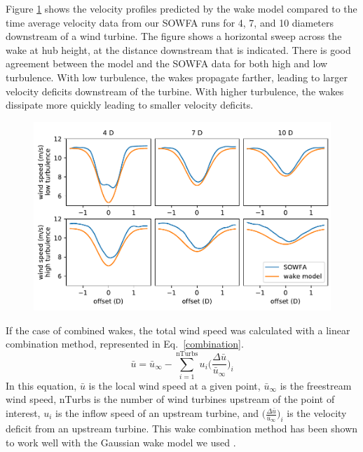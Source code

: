 \documentclass[11pt,letterpaper]{article}
\begin{document}
Figure \ref{velocity_profiles} shows the velocity profiles predicted by the wake model compared to the time average velocity data from our SOWFA runs for 4, 7, and 10 diameters downstream of a wind turbine. The figure shows a horizontal sweep across the wake at hub height, at the distance downstream that is indicated. There is good agreement between the model and the SOWFA data for both high and low turbulence. With low turbulence, the wakes propagate farther, leading to larger velocity deficits downstream of the turbine. With higher turbulence, the wakes dissipate more quickly leading to smaller velocity deficits. 
% 
\begin{figure}
    \centering
    \includegraphics[]{images/velocity_profiles.pdf}
    \caption{}
    \label{velocity_profiles}
\end{figure}

If the case of combined wakes, the total wind speed was calculated with a linear combination method, represented in Eq.~\ref{combination}.
%
\begin{equation}
    \label{combination}
    \bar{u} = \bar{u}_\infty - \sum_{i=1}^\text{nTurbs} u_i \Big(\frac{\Delta\bar{u}}{\bar{u}_{\infty}}\Big)_i
\end{equation}
% 
In this equation, $\bar{u}$ is the local wind speed at a given point, $\bar{u}_\infty$ is the freestream wind speed, $\text{nTurbs}$ is the number of wind turbines upstream of the point of interest, $u_i$ is the inflow speed of an upstream turbine, and $\Big(\frac{\Delta\bar{u}}{\bar{u}_{\infty}}\Big)_i$ is the velocity deficit from an upstream turbine. This wake combination method has been shown to work well with the Gaussian wake model we used \cite{niayifar2016analytical}.
\end{document}
